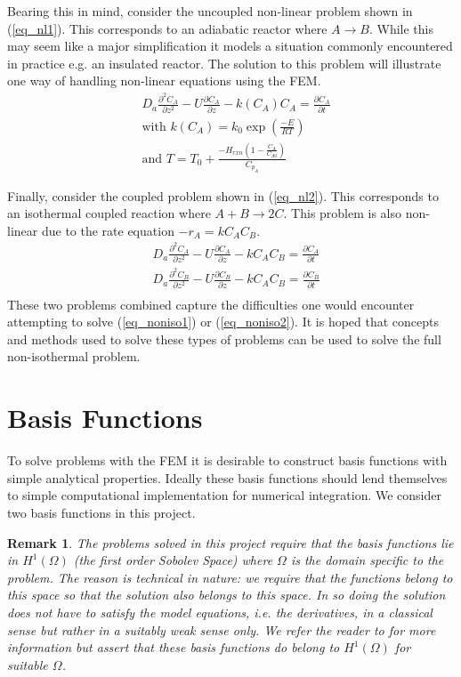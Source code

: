 \documentclass[11pt,fleqn]{article}
\theoremstyle{defstyle}
\newtheorem{rmrk}{Remark}[section]
\begin{document}
Bearing this in mind, consider the uncoupled non-linear problem shown in (\ref{eq_nl1}). This corresponds to an adiabatic reactor where $A \rightarrow B$. While this may seem like a major simplification it models a situation commonly encountered in practice e.g. an insulated reactor. The solution to this problem will illustrate one way of handling non-linear equations using the FEM.
\begin{equation}
\begin{aligned}
&D_a \frac{\partial^2 C_A}{\partial z^2} - U \frac{\partial C_A}{\partial z} - k(C_A)
C_A = \frac{\partial C_A}{\partial t} \\
& \text{with }k(C_A) = k_0 \exp(\frac{-E}{RT}) \\
& \text{and } T = T_0 + \frac{-H_{rxn} (1-\frac{C_A}{C_{A0}})}{C_{p_A}}
\end{aligned}
\label{eq_nl1}
\end{equation}  

Finally, consider the coupled problem shown in (\ref{eq_nl2}). This corresponds to an isothermal coupled reaction where $A + B \rightarrow 2C$. This problem is also non-linear due to the rate equation $-r_A = kC_AC_B$.
\begin{equation}
\begin{aligned}
&D_a \frac{\partial^2 C_A}{\partial z^2} - U \frac{\partial C_A}{\partial z} - kC_AC_B 
= \frac{\partial C_A}{\partial t} \\
&D_a \frac{\partial^2 C_B}{\partial z^2} - U \frac{\partial C_B}{\partial z} - kC_AC_B 
= \frac{\partial C_B}{\partial t} \\
\end{aligned}
\label{eq_nl2}
\end{equation}
These two problems combined capture the difficulties one would encounter attempting to solve (\ref{eq_noniso1}) or (\ref{eq_noniso2}). It is hoped that concepts and methods used to solve these types of problems can be used to solve the full non-isothermal problem.

\section{Basis Functions}
To solve problems with the FEM it is desirable to construct basis functions with simple analytical properties. Ideally these basis functions should lend themselves to simple computational implementation for numerical integration. We consider two basis functions in this project. 
\begin{rmrk}
The problems solved in this project require that the basis functions lie in $H^1(\Omega)$ (the first order Sobolev Space) where $\Omega$ is the domain specific to the problem. The reason is technical in nature: we require that the functions belong to this space so that the solution also belongs to this space. In so doing the solution does not have to satisfy the model equations, i.e. the derivatives, in a classical sense but rather in a suitably weak sense only. We refer the reader to \cite{strang} for more information but assert that these basis functions do belong to $H^1(\Omega)$ for suitable $\Omega$.  
\end{rmrk}
\end{document}
